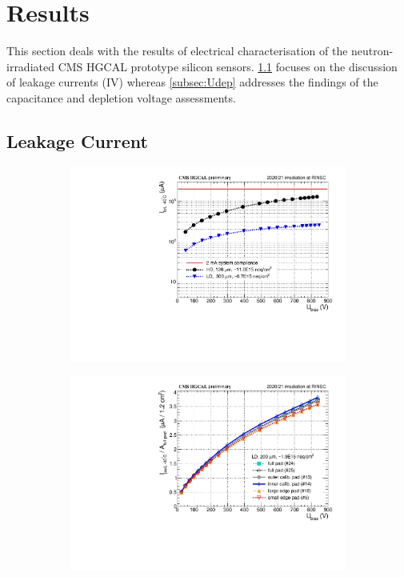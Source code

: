\section{Results}
\label{sec:results}
This section deals with the results of electrical characterisation of the neutron-irradiated CMS HGCAL prototype silicon sensors. 
\ref{subsec:leakagecurrents} focuses on the discussion of leakage currents (IV) whereas \ref{subsec:Udep} addresses the findings of the capacitance and depletion voltage assessments. 

\subsection{Leakage Current}
\label{subsec:leakagecurrents}
\begin{figure}
	\captionsetup[subfigure]{aboveskip=-1pt,belowskip=-1pt}
	\centering
	\begin{subfigure}[b]{0.49\textwidth}
		\includegraphics[width=0.999\textwidth]{plots/total_iv/total_current_IV.pdf}
		\subcaption{
		}
		\label{plot:tot_IV_good}
    \end{subfigure}
    \hfill
    \begin{subfigure}[b]{0.49\textwidth}
        \includegraphics[width=0.999\textwidth]{plots/channel_iv/channel_IV_sensors_channels.pdf}
        \subcaption{
        }
        \label{plot:pad_IV_channels}
    \end{subfigure}


\end{figure}

